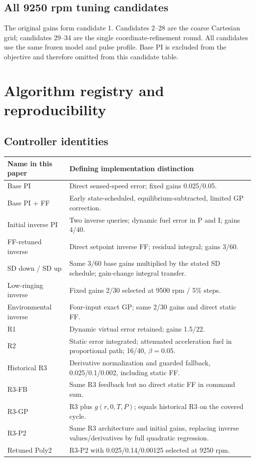 \section{All 9250 rpm tuning candidates}
The original gains form candidate 1. Candidates 2--28 are the coarse Cartesian grid; candidates 29--34 are the single coordinate-refinement round. All candidates use the same frozen model and pulse profile. Base PI is excluded from the objective and therefore omitted from this candidate table.


\chapter{Algorithm registry and reproducibility}
\label{app:repro}
\section{Controller identities}
\begin{longtable}{@{}p{.24\linewidth}p{.70\linewidth}@{}}
\toprule Name in this paper & Defining implementation distinction\\\midrule\endhead
Base PI & Direct sensed-speed error; fixed gains 0.025/0.05.\\
Base PI + FF & Early state-scheduled, equilibrium-subtracted, limited GP correction.\\
Initial inverse PI & Two inverse queries; dynamic fuel error in P and I; gains 4/40.\\
FF-retuned inverse & Direct setpoint inverse FF; residual integral; gains 3/60.\\
SD down / SD up & Same 3/60 base gains multiplied by the stated SD schedule; gain-change integral transfer.\\
Low-ringing inverse & Fixed gains 2/30 selected at 9500 rpm / 5\% steps.\\
Environmental inverse & Four-input exact GP; same 2/30 gains and direct static FF.\\
R1 & Dynamic virtual error retained; gains 1.5/22.\\
R2 & Static error integrated; attenuated acceleration fuel in proportional path; 16/40, $\beta=0.05$.\\
Historical R3 & Derivative normalization and guarded fallback, 0.025/0.1/0.002, including static FF.\\
R3-FB & Same R3 feedback but no direct static FF in command sum.\\
R3-GP & R3 plus $g(r,0,T,P)$; equals historical R3 on the covered cycle.\\
R3-P2 & Same R3 architecture and initial gains, replacing inverse values/derivatives by full quadratic regression.\\
Retuned Poly2 & R3-P2 with 0.025/0.14/0.00125 selected at 9250 rpm.\\
\bottomrule
\end{longtable}

